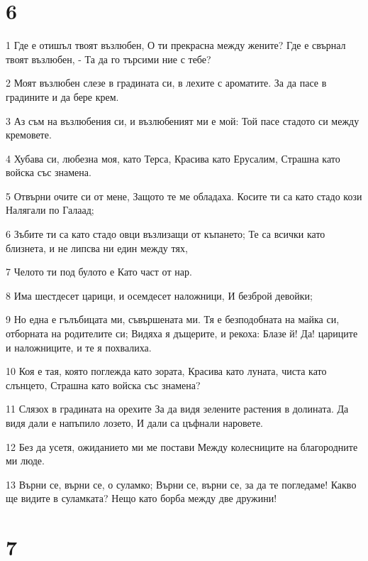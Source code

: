 \chapter{6}

\par 1 Где е отишъл твоят възлюбен, О ти прекрасна между жените? Где е свърнал твоят възлюбен, - Та да го търсими ние с тебе?
\par 2 Моят възлюбен слезе в градината си, в лехите с ароматите. За да пасе в градините и да бере крем.
\par 3 Аз съм на възлюбения си, и възлюбеният ми е мой: Той пасе стадото си между кремовете.
\par 4 Хубава си, любезна моя, като Терса, Красива като Ерусалим, Страшна като войска със знамена.
\par 5 Отвърни очите си от мене, Защото те ме обладаха. Косите ти са като стадо кози Налягали по Галаад;
\par 6 Зъбите ти са като стадо овци възлизащи от къпането; Те са всички като близнета, и не липсва ни един между тях,
\par 7 Челото ти под булото е Като част от нар.
\par 8 Има шестдесет царици, и осемдесет наложници, И безброй девойки;
\par 9 Но една е гълъбицата ми, съвършената ми. Тя е безподобната на майка си, отборната на родителите си; Видяха я дъщерите, и рекоха: Блазе й! Да! цариците и наложниците, и те я похвалиха.
\par 10 Коя е тая, която поглежда като зората, Красива като луната, чиста като слънцето, Страшна като войска със знамена?
\par 11 Слязох в градината на орехите За да видя зелените растения в долината. Да видя дали е напъпило лозето, И дали са цъфнали наровете.
\par 12 Без да усетя, ожиданието ми ме постави Между колесниците на благородните ми люде.
\par 13 Върни се, върни се, о суламко; Върни се, върни се, за да те погледаме! Какво ще видите в суламката? Нещо като борба между две дружини!

\chapter{7}

